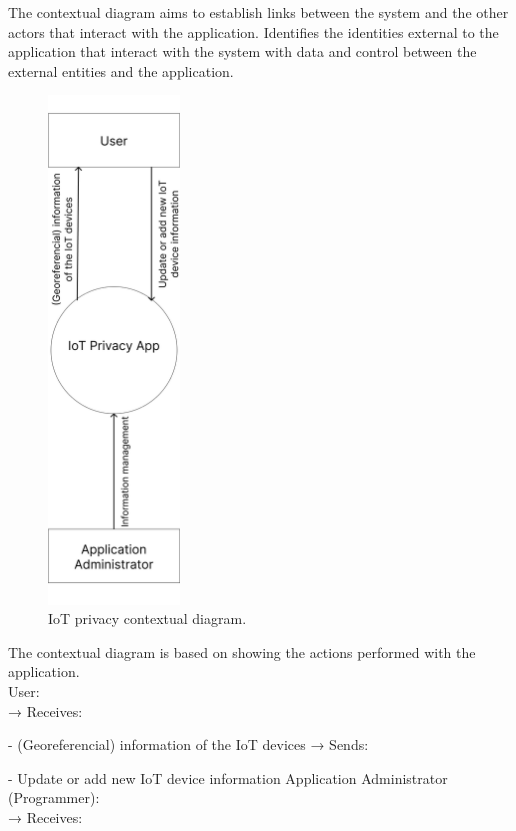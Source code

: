 The contextual diagram aims to establish links between the system
and the other actors that interact with the application.
\newline
Identifies the identities external to the application that interact with
the system with data and control between the external entities and the application.
\begin{figure}[H]
    \centering
    \includegraphics[width=3.5cm]{../app/docs/software_requirements/assets/images/contextual_diagram.png}
    \caption{IoT privacy contextual diagram.}
    \label{fig:contextual diagram}
\end{figure}
The contextual diagram is based on showing the actions performed with the
application. \\
\newline
User: \\
\newline
→ Receives:

- (Georeferencial) information of the IoT devices
\newline
→ Sends:

- Update or add new IoT device information \newline
\newline
Application Administrator (Programmer): \\
\newline
→ Receives:

